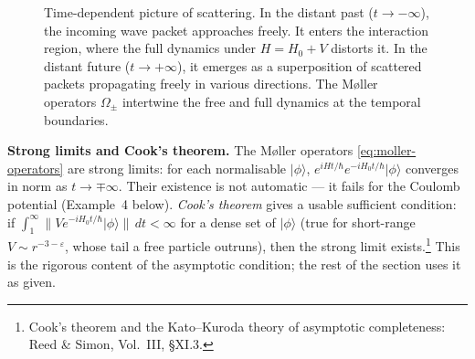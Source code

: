 \begin{figure}[htbp!]
\centering
{}
\caption{Time-dependent picture of scattering. In the distant past ($t\to-\infty$), the incoming wave packet approaches freely. It enters the interaction region, where the full dynamics under $H=H_{0}+V$ distorts it. In the distant future ($t\to+\infty$), it emerges as a superposition of scattered packets propagating freely in various directions. The M\o{}ller operators $\Omega_{\pm}$ intertwine the free and full dynamics at the temporal boundaries.}
\label{fig:time-dependent-scattering}
\end{figure}

\medskip\noindent\textbf{Strong limits and Cook's theorem.} The M\o{}ller operators \eqref{eq:moller-operators} are strong limits: for each normalisable $|\phi\rangle$, $e^{iHt/\hbar}e^{-iH_{0}t/\hbar}|\phi\rangle$ converges in norm as $t\to\mp\infty$. Their existence is not automatic --- it fails for the Coulomb potential (Example~4 below). \emph{Cook's theorem} gives a usable sufficient condition: if $\int_{1}^{\infty}\|V e^{-iH_{0}t/\hbar}|\phi\rangle\|\,dt<\infty$ for a dense set of $|\phi\rangle$ (true for short-range $V\sim r^{-3-\varepsilon}$, whose tail a free particle outruns), then the strong limit exists.\footnote{Cook's theorem and the Kato--Kuroda theory of asymptotic completeness: Reed \& Simon, Vol.~III, \S XI.3.} This is the rigorous content of the asymptotic condition; the rest of the section uses it as given.


